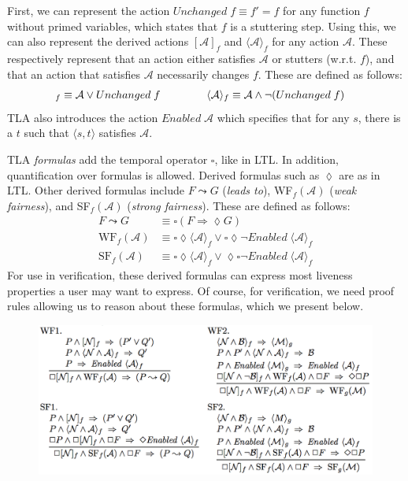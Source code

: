 \documentclass{llncs}
\begin{document}
First, we can represent the action $Unchanged\;f \equiv f' = f$ for any 
function $f$  without primed variables, which states that $f$ is a
stuttering step. Using this, we can also represent the derived actions
$[\mathcal A]_f$ and $\langle \mathcal A \rangle_f$ for any action
$\mathcal A$. These respectively represent that an action either satisfies $\mathcal A$ or
stutters (w.r.t. $f$), and that an action that satisfies $\mathcal A$
necessarily changes $f$. These are defined as follows:
\begin{align*}
  [\mathcal A]_f \equiv \mathcal A \vee Unchanged\;f \hspace{1.5cm}
  & \langle \mathcal A \rangle_f \equiv \mathcal A \wedge \neg(Unchanged\;f)
\end{align*}
TLA also introduces the action $Enabled\;\mathcal A$ which specifies that for
any $s$, there is a $t$ such that $\langle s, t \rangle$ satisfies $\mathcal A$.

TLA \textit{formulas} add the temporal operator $\square$, like in LTL. In
addition, quantification over formulas is allowed. Derived formulas such as
$\lozenge$ are as in LTL. Other derived formulas include $F \leadsto G$
(\textit{leads to}), WF$_f(\mathcal A)$ (\textit{weak fairness}), and
SF$_f(\mathcal A)$ (\textit{strong fairness}). These are defined as follows:
\begin{align*}
  F \leadsto G &\equiv \square(F \Rightarrow \lozenge G) \\
  \text{WF}_f(\mathcal A) &\equiv \square\lozenge\langle\mathcal A\rangle_f \vee \square\lozenge\neg Enabled\;\langle\mathcal A\rangle_f \\
  \text{SF}_f(\mathcal A) &\equiv \square\lozenge\langle\mathcal A\rangle_f \vee \lozenge\square\neg Enabled\;\langle\mathcal A\rangle_f
\end{align*}
For use in verification, these derived formulas can express most liveness
properties a user may want to express. Of course, for verification, we need
proof rules allowing us to reason about these formulas, which we present below.

\begin{figure}
\includegraphics[scale=0.6]{tla-rules}
\centering
\end{figure}
\end{document}
